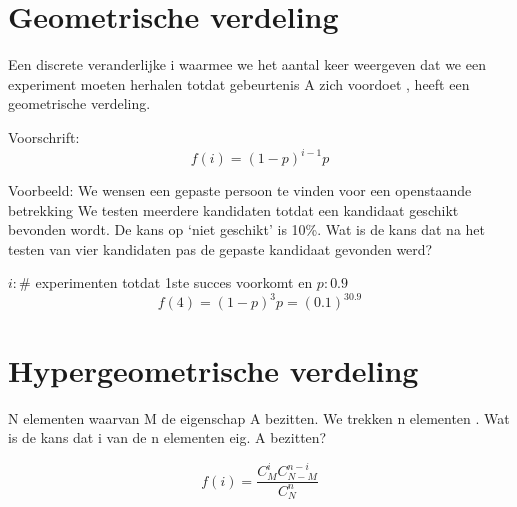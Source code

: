 \documentclass[12pt]{report}
\newcommand{\example}[2]{
      \hrulefill
      
      Voorbeeld: #1
      
      #2
      
      \hrulefill
  }
\begin{document}
\section{Geometrische verdeling}
Een discrete veranderlijke 
i
waarmee we het 
aantal keer
weergeven dat  we een experiment 
moeten herhalen 
totdat gebeurtenis A zich 
voordoet
, heeft een 
geometrische verdeling.

Voorschrift:
$$f(i) = (1 - p)^{i - 1}p$$
\example{
    We wensen een gepaste persoon te vinden voor een 
    openstaande betrekking
    We testen meerdere kandidaten totdat een kandidaat 
    geschikt bevonden wordt.
    De kans op ‘niet geschikt’ is 10\%.
    Wat is de kans dat na het testen van vier kandidaten pas 
    de gepaste kandidaat gevonden werd?
}{
    $i : \#$ experimenten totdat 1ste succes voorkomt en $p: 0.9$
    $$f(4) = (1 - p)^3p = (0.1)^30.9$$
}

\section{Hypergeometrische verdeling}
N elementen waarvan M de eigenschap A bezitten.
We trekken n elementen .
Wat is de kans dat i van de n elementen eig. A bezitten?

$$f(i) = \frac{C_M^iC_{N - M}^{n - i}}{C_N^n}$$
\end{document}
